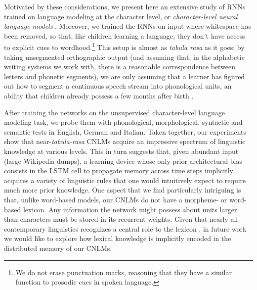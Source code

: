 Motivated by these considerations, we present here an extensive study
of RNNs trained on language modeling at the character level, or
\emph{character-level neural language models}
\cite[CNLMs,][]{Mikolov:etal:2011,Sutskever:etal:2011,Graves:2014}. Moreover,
we trained the RNNs on input where whitespace has been removed, so
that, like children learning a language, they don't have access to
explicit cues to wordhood.\footnote{We do not erase punctuation marks,
  reasoning that they have a similar function to prosodic cues in
  spoken language.} This setup is almost as \emph{tabula rasa} as it
goes: by taking unsegmented orthographic output (and assuming that, in
the alphabetic writing systems we work with, there is a reasonable
correspondence between letters and phonetic segments), we are only
assuming that a learner has figured out how to segment a continuous
speech stream into phonological units, an ability that children
already possess a few months after birth
\cite[e.g.,][]{Maye:etal:2002,Kuhl:2004}.

After training the networks on the unsupervised character-level
language modeling task, we probe them with phonological,
morphological, syntactic and semantic tests in English, German and
Italian. Taken together, our experiments show that
near-\emph{tabula-rasa} CNLMs acquire an impressive spectrum of
linguistic knowledge at various levels.  This in turn suggests that,
given abundant input (large Wikipedia dumps), a learning device whose
only prior architectural bias consists in the LSTM cell to propagate
memory across time steps implicitly acquires a variety of linguistic
rules that one would intuitively expect to require much more prior
knowledge. One aspect that we find particularly intriguing is that,
unlike word-based models, our CNLMs do not have a morpheme- or
word-based lexicon. Any information the network might possess about
units larger than characters must be stored in its recurrent
weights. Given that nearly all contemporary linguistics recognizes a
central role to the lexicon \cite[see, e.g.,][for different
perspectives]{Sag:etal:2003,Goldberg:2005,Radford:2006,Bresnan:etal:2016,Jezek:2016},
in future work we would like to explore how lexical knowledge is
implicitly encoded in the distributed memory of our CNLMs.



